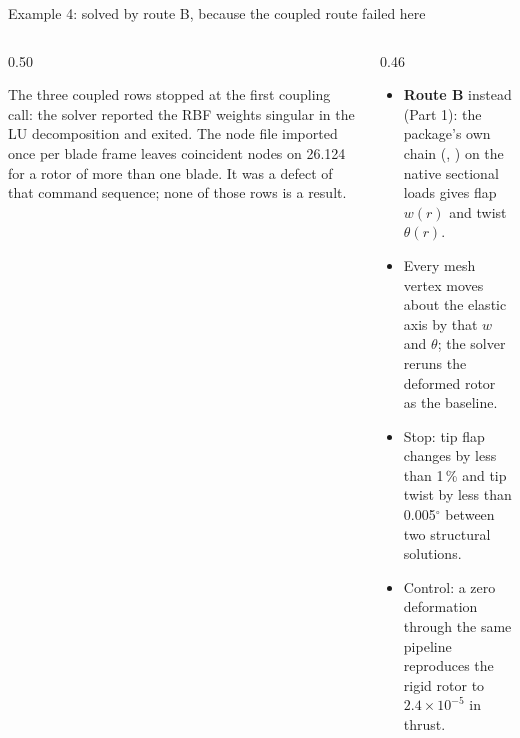 \begin{frame}{Example 4: solved by route B, because the coupled route failed here}
\begin{columns}[T]
\begin{column}{0.50\textwidth}
\begin{ftslimit}
\scriptsize
The three coupled rows stopped at the first coupling call: the solver reported
the RBF weights singular in the LU decomposition and exited. The node file
imported once per blade frame leaves coincident nodes on 26.124 for a rotor of
more than one blade. It was a defect of that command sequence; none of those
rows is a result.
\end{ftslimit}
\end{column}
\begin{column}{0.46\textwidth}
\begin{itemize}\scriptsize
  \item \textbf{Route B} instead (Part 1): the package's own chain
        (, ) on the native
        sectional loads gives flap \(w(r)\) and twist \(\theta(r)\).
  \item Every mesh vertex moves about the elastic axis by that \(w\) and
        \(\theta\); the solver reruns the deformed rotor as the baseline.
  \item Stop: tip flap changes by less than 1\,\% and tip twist by less than
        0.005\(^\circ\) between two structural solutions.
  \item Control: a zero deformation through the same pipeline reproduces the
        rigid rotor to \(2.4\times10^{-5}\) in thrust.
\end{itemize}
\end{column}
\end{columns}
\end{frame}

